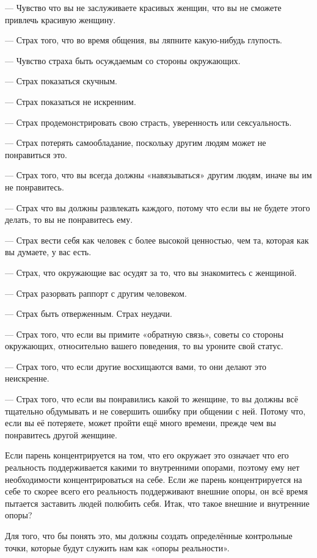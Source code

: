 --- Чувство что вы не заслуживаете красивых женщин, что вы не сможете привлечь красивую женщину.

--- Страх того, что во время общения, вы ляпните какую-нибудь глупость.

--- Чувство страха быть осуждаемым со стороны окружающих.

--- Страх показаться скучным.

--- Страх показаться не искренним.

--- Страх продемонстрировать свою страсть, уверенность или сексуальность.

--- Страх потерять самообладание, поскольку другим людям может не понравиться это.

--- Страх того, что вы всегда должны «навязываться» другим людям, иначе вы им не понравитесь.

--- Страх что вы должны развлекать каждого, потому что если вы не будете этого делать, то вы не понравитесь ему.

--- Страх вести себя как человек с более высокой ценностью, чем та, которая как вы думаете, у вас есть.

--- Страх, что окружающие вас осудят за то, что вы знакомитесь с женщиной.

--- Страх разорвать раппорт с другим человеком.

--- Страх быть отверженным. Страх неудачи.

--- Страх того, что если вы примите «обратную связь», советы со стороны окружающих, относительно вашего поведения, то вы уроните свой статус.

--- Страх того, что если другие восхищаются вами, то они делают это неискренне.

--- Страх того, что если вы понравились какой то женщине, то вы должны всё тщательно обдумывать и не совершить ошибку при общении с ней. Потому что, если вы её потеряете, может пройти ещё много времени, прежде чем вы понравитесь другой женщине.

Если парень концентрируется на том, что его окружает это означает что его реальность поддерживается какими то внутренними опорами, поэтому ему нет необходимости концентрироваться на себе. Если же парень концентрируется на себе то скорее всего его реальность поддерживают внешние опоры, он всё время пытается заставить людей полюбить себя.
Итак, что такое внешние и внутренние опоры?

Для того, что бы понять это, мы должны создать определённые контрольные точки, которые будут служить нам как «опоры реальности».

